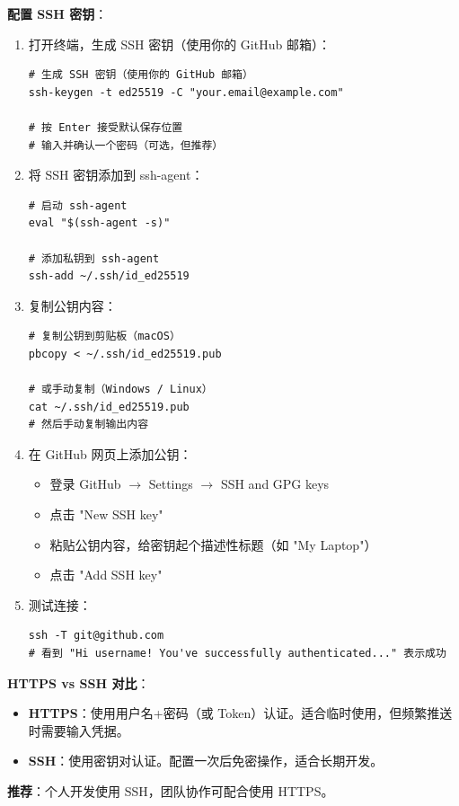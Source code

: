 \documentclass[12pt,a4paper,openany]{ctexbook}
\begin{document}
\textbf{配置 SSH 密钥}：
\medskip
\begin{enumerate}[leftmargin=1.5em]
  \item 打开终端，生成 SSH 密钥（使用你的 GitHub 邮箱）：
\begin{lstlisting}[style=shellinbox]
# 生成 SSH 密钥（使用你的 GitHub 邮箱）
ssh-keygen -t ed25519 -C "your.email@example.com"

# 按 Enter 接受默认保存位置
# 输入并确认一个密码（可选，但推荐）
\end{lstlisting}
  \item 将 SSH 密钥添加到 ssh-agent：
\begin{lstlisting}[style=shellinbox]
# 启动 ssh-agent
eval "$(ssh-agent -s)"

# 添加私钥到 ssh-agent
ssh-add ~/.ssh/id_ed25519
\end{lstlisting}
  \item 复制公钥内容：
\begin{lstlisting}[style=shellinbox]
# 复制公钥到剪贴板（macOS）
pbcopy < ~/.ssh/id_ed25519.pub

# 或手动复制（Windows / Linux）
cat ~/.ssh/id_ed25519.pub
# 然后手动复制输出内容
\end{lstlisting}
  \item 在 GitHub 网页上添加公钥：
  \begin{itemize}
    \item 登录 GitHub $\to$ Settings $\to$ SSH and GPG keys
    \item 点击 "New SSH key"
    \item 粘贴公钥内容，给密钥起个描述性标题（如 "My Laptop"）
    \item 点击 "Add SSH key"
  \end{itemize}
  \item 测试连接：
\begin{lstlisting}[style=shellinbox]
ssh -T git@github.com
# 看到 "Hi username! You've successfully authenticated..." 表示成功
\end{lstlisting}
\end{enumerate}
\medskip

\medskip
\textbf{HTTPS vs SSH 对比}：
\begin{itemize}
  \item \textbf{HTTPS}：使用用户名+密码（或 Token）认证。适合临时使用，但频繁推送时需要输入凭据。
  \item \textbf{SSH}：使用密钥对认证。配置一次后免密操作，适合长期开发。
\end{itemize}
\textbf{推荐}：个人开发使用 SSH，团队协作可配合使用 HTTPS。
\medskip
\end{document}
